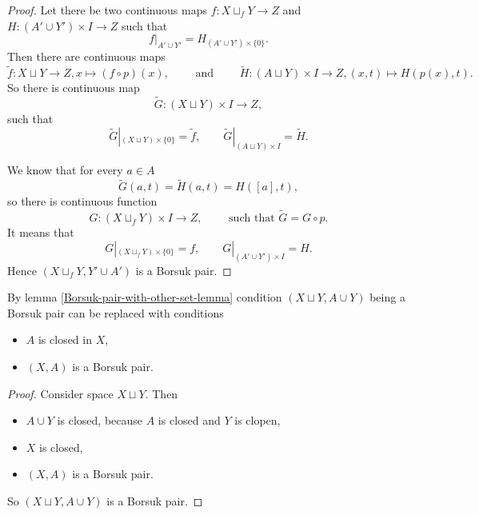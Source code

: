 \documentclass[12pt,a4paper]{article}
\begin{document}
\begin{problem}{21}
\begin{proof}
            Let there be two continuous maps $f: X \sqcup_f Y \to Z$ and $H: (A' \cup Y') \times I \to Z$ such that
            \[f|_{A' \cup Y'} = H_{(A' \cup Y') \times \{0\}}.\]
            Then there are continuous maps
            \[
                \widetilde{f}: X \sqcup Y \to Z, x \mapsto (f \circ p)(x),
                \qquad \text{ and } \qquad
                \widetilde{H}: (A \sqcup Y) \times I \to Z, (x, t) \mapsto H(p(x), t).
            \]
            So there is continuous map
            \[
                \widetilde{G}: (X \sqcup Y) \times I \to Z,
            \]
            such that
            \[
                \widetilde{G}|_{(X \sqcup Y) \times \{0\}} = \widetilde{f},
                \qquad
                \widetilde{G}|_{(A \sqcup Y) \times I} = \widetilde{H}.
            \]

            We know that for every $a \in A$
            \[\widetilde{G}(a, t) = \widetilde{H}(a, t) = H([a], t),\]
            so there is continuous function
            \[
                G: (X \sqcup_f Y) \times I \to Z,
                \qquad \text{ such that }
                \widetilde{G} = G \circ p.
            \]
            It means that
            \[
                G|_{(X \sqcup_f Y) \times \{0\}} = f,
                \qquad
                G|_{(A' \cup Y') \times I} = H.
            \]
            Hence $(X \sqcup_f Y, Y' \cup A')$ is a Borsuk pair.
        \end{proof}

        \begin{corollary}
            By lemma \ref{Borsuk-pair-with-other-set-lemma} condition $(X \sqcup Y, A \cup Y)$ being a Borsuk pair can be replaced with conditions
            \begin{itemize}
                \item $A$ is closed in $X$,
                \item $(X, A)$ is a Borsuk pair.
            \end{itemize}
        \end{corollary}

        \begin{proof}
            Consider space $X \sqcup Y$. Then
            \begin{itemize}
                \item $A \cup Y$ is closed, because $A$ is closed and $Y$ is clopen,
                \item $X$ is closed,
                \item $(X, A)$ is a Borsuk pair.
            \end{itemize}
            So $(X \sqcup Y, A \cup Y)$ is a Borsuk pair.
        \end{proof}


\end{problem}
\end{document}
